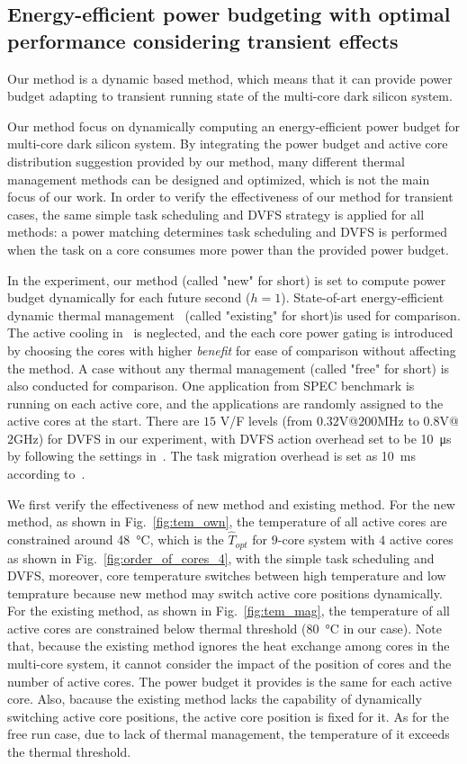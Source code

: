 \subsection{Energy-efficient power budgeting with optimal performance considering transient effects}
Our method is a dynamic based method, which means that it can provide power budget adapting to transient running state of the multi-core dark silicon system.

Our method focus on dynamically computing an energy-efficient power budget for multi-core dark silicon system. By integrating the power budget and active core distribution suggestion provided by our method, many different thermal management methods can be designed and optimized, which is not the main focus of our work. In order to verify the effectiveness of our method for transient cases, the same simple task scheduling and DVFS strategy is applied for all methods: a power matching determines task scheduling and DVFS is performed when the task on a core consumes more power than the provided power budget.

In the experiment, our method (called "new" for short) is set to compute power budget dynamically for each future second ($h=1$). State-of-art energy-efficient dynamic thermal management~\cite{Hanumaiah:TCOMP'14} (called "existing" for short)is used for comparison. The active cooling in~\cite{Hanumaiah:TCOMP'14} is neglected, and the each core power gating is introduced by choosing the cores with higher \emph{benefit} for ease of comparison without affecting the method. A case without any thermal management (called "free" for short) is also conducted for comparison. One application from SPEC benchmark is running on each active core, and the applications are randomly assigned to the active cores at the start. There are $15$ V/F levels (from $0.32$V@$200$MHz to $0.8$V@$2$GHz) for DVFS in our experiment, with DVFS action overhead set to be \SI{10}{\us} by following the settings in~\cite{Lu:MICRO'05}. The task migration overhead is set as \SI{10}{\ms} according to~\cite{Cuesta:ISVLSI'10}.

We first verify the effectiveness of new method and existing method. For the new method, as shown in Fig.~\ref{fig:tem_own}, the temperature of all active cores are constrained around \SI{48}{\degreeCelsius}, which is the $\hat{T}_{opt}$ for $9$-core system with $4$ active cores as shown in Fig.~\ref{fig:order_of_cores_4}, with the simple task scheduling and DVFS, moreover, core temperature switches between high temperature and low temprature because new method may switch active core positions dynamically. For the existing method, as shown in Fig.~\ref{fig:tem_mag}, the temperature of all active cores are constrained below thermal threshold (\SI{80}{\degreeCelsius} in our case). Note that, because the existing method ignores the heat exchange among cores in the multi-core system, it cannot consider the impact of the position of cores and 
the number of active cores. The power budget it provides is the same for each active core. Also, bacause the existing method lacks the capability of dynamically switching active core positions, the active core position is fixed for it. As for the free run case, due to lack of thermal management, the temperature of it exceeds the thermal threshold.

